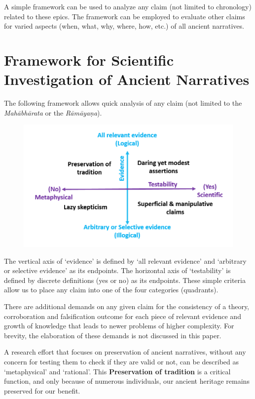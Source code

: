 A simple framework can be used to analyze any claim (not limited to chronology) related to these epics. The framework can be employed to evaluate other claims for varied aspects (when, what, why, where, how, etc.) of all ancient narratives.


\section*{Framework for Scientific Investigation of Ancient Narratives}

The following framework allows quick analysis of any claim (not limited to the \textit{Mahābhārata} or the \textit{Rāmāyaṇa}).
\begin{figure}[H]
\includegraphics[scale=.3]{images/chap2-2.jpg}
\caption{}
\end{figure}

The vertical axis of ‘evidence’ is defined by ‘all relevant evidence’ and ‘arbitrary or selective evidence’ as its endpoints. The horizontal axis of ‘testability’ is defined by discrete definitions (yes or no) as its endpoints. These simple criteria allow us to place any claim into one of the four categories (quadrants).

There are additional demands on any given claim for the consistency of a theory, corroboration and falsification outcome for each piece of relevant evidence and growth of knowledge that leads to newer problems of higher complexity. For brevity, the elaboration of these demands is not discussed in this paper.


A research effort that focuses on preservation of ancient narratives, without any concern for testing them to check if they are valid or not, can be described as ‘metaphysical’ and ‘rational’. This \textbf{Preservation of tradition} is a critical function, and only because of numerous individuals, our ancient heritage remains preserved for our benefit.

